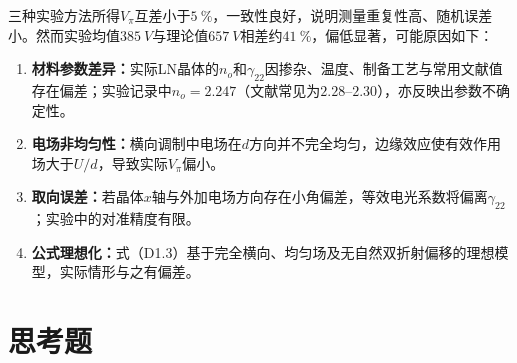 \documentclass[a4paper,8pt,twocolumn]{article}
\begin{document}
三种实验方法所得$V_\pi$互差小于$\SI{5}{\percent}$，一致性良好，说明测量重复性高、随机误差小。然而实验均值$\SI{385}{V}$与理论值$\SI{657}{V}$相差约$\SI{41}{\percent}$，偏低显著，可能原因如下：

\begin{enumerate}
  \item \textbf{材料参数差异：}实际LN晶体的$n_o$和$\gamma_{22}$因掺杂、温度、制备工艺与常用文献值存在偏差；实验记录中$n_o=2.247$（文献常见为$2.28$--$2.30$），亦反映出参数不确定性。
  \item \textbf{电场非均匀性：}横向调制中电场在$d$方向并不完全均匀，边缘效应使有效作用场大于$U/d$，导致实际$V_\pi$偏小。
  \item \textbf{取向误差：}若晶体$x$轴与外加电场方向存在小角偏差，等效电光系数将偏离$\gamma_{22}$；实验中的对准精度有限。
  \item \textbf{公式理想化：}式（D1.3）基于完全横向、均匀场及无自然双折射偏移的理想模型，实际情形与之有偏差。
\end{enumerate}

\section{思考题}
\end{document}
